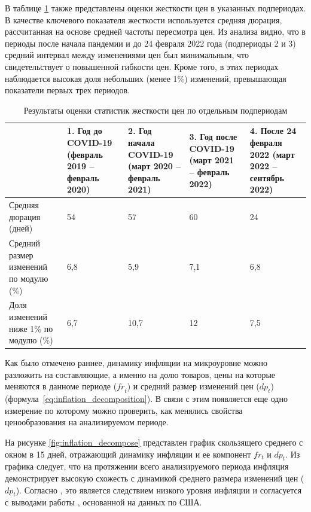В таблице \ref{tab:price_rigidity_stats} также представлены оценки жесткости цен в указанных подпериодах. В качестве ключевого показателя жесткости используется средняя дюрация, рассчитанная на основе средней частоты пересмотра цен. Из анализа видно, что в периоды после начала пандемии и до 24 февраля 2022 года (подпериоды 2 и 3) средний интервал между изменениями цен был минимальным, что свидетельствует о повышенной гибкости цен. Кроме того, в этих периодах наблюдается высокая доля небольших (менее 1\%) изменений, превышающая показатели первых трех периодов.

\begin{table}[h]
	\centering
	\small %
	\caption{Результаты оценки статистик жесткости цен по отдельным подпериодам}
	\label{tab:price_rigidity_stats}
	\begin{tabularx}{\textwidth}{|X|X|X|X|X|} %
		\hline
		& \textbf{1. Год до COVID-19 (февраль 2019 – февраль 2020)} & \textbf{2. Год начала COVID-19 (март 2020 – февраль 2021)} & \textbf{3. Год после COVID-19 (март 2021 – февраль 2022)} & \textbf{4. После 24 февраля 2022 (март 2022 – сентябрь 2022)} \\
		\hline
		Средняя дюрация (дней) & 54 & 57 & 60 & 24 \\
		\hline
		Средний размер изменений по модулю (\%) & 6,8 & 5,9 & 7,1 & 6,8 \\
		\hline
		Доля изменений ниже 1\% по модулю (\%) & 6,7 & 10,7 & 12 & 7,5 \\
		\hline
	\end{tabularx}
\end{table}

Как было отмечено раннее, динамику инфляции на микроуровне можно разложить на составляющие, а именно на долю товаров, цены на которые меняются в данноме периоде ($\mathit{fr}_t$) и средний размер изменений цен ($\mathit{dp}_t$) (формула~\ref{eq:inflation_decomposition}). В связи с этим появляется еще одно измерение по которому можно проверить, как менялись свойства ценообразования на анализируемом периоде.


На рисунке \ref{fig:inflation_decompose} представлен график скользящего среднего с окном в 15 дней, отражающий динамику инфляции и ее компонент $fr_t$ и $dp_t$. Из графика следует, что на протяжении всего анализируемого периода инфляция демонстрирует высокую схожесть с динамикой среднего размера изменений цен ($dp_t$). Согласно \cite{gagnon2009}, это является следствием низкого уровня инфляции и согласуется с выводами работы \cite{KlenowKryvtsov2008}, основанной на данных по США.  

